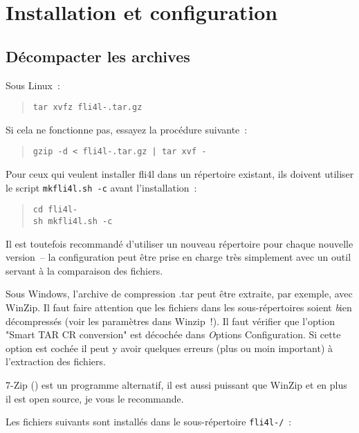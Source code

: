 
\chapter{Installation et configuration}

\section{Décompacter les archives}

Sous Linux~:

\begin{verse}\texttt{tar xvfz fli4l-\version.tar.gz}\end{verse}

\noindent Si cela ne fonctionne pas, essayez la procédure suivante~:

\begin{verse}\texttt{gzip -d < fli4l-\version.tar.gz | tar xvf -}\end{verse}

Pour ceux qui veulent installer fli4l dans un répertoire existant, ils doivent
utiliser le script \texttt{mkfli4l.sh -c} avant l'installation~:

\begin{verse}
    \texttt{cd fli4l-\version}\\
    \texttt{sh mkfli4l.sh -c}
\end{verse}

Il est toutefois recommandé d'utiliser un nouveau répertoire pour chaque nouvelle
version~-- la configuration peut être prise en charge très simplement avec un
outil servant à la comparaison des fichiers.

Sous Windows, l'archive de compression .tar peut être extraite, par exemple,
avec WinZip. Il faut faire attention que les fichiers dans les sous-répertoires
soient {\emph bien} décompressés (voir les paramètres dans Winzip~!). Il faut
vérifier que l'option "Smart TAR CR conversion" est décochée dans
{\emph Options \pfeil Configuration}. Si cette option est cochée il peut y avoir
quelques erreurs (plus ou moin important) à l'extraction des fichiers.

7-Zip () est un programme alternatif, il est
aussi puissant que WinZip et en plus il est open source, je vous le recommande.

Les fichiers suivants sont installés dans le sous-répertoire \texttt{fli4l-\version/}~:

